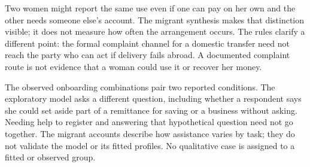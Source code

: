 Two women might report the same use even if one can pay on her own and the other needs someone else's account. The migrant synthesis makes that distinction visible; it does not measure how often the arrangement occurs. The rules clarify a different point: the formal complaint channel for a domestic transfer need not reach the party who can act if delivery fails abroad. A documented complaint route is not evidence that a woman could use it or recover her money.

The observed onboarding combinations pair two reported conditions. The exploratory model asks a different question, including whether a respondent says she could set aside part of a remittance for saving or a business without asking. Needing help to register and answering that hypothetical question need not go together. The migrant accounts describe how assistance varies by task; they do not validate the model or its fitted profiles. No qualitative case is assigned to a fitted or observed group.
